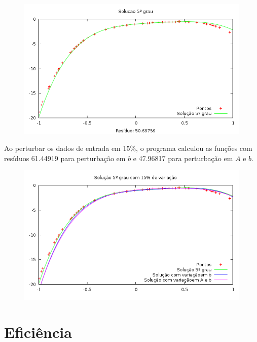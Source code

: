 \begin{figure}[h]
\centering
\includegraphics[scale=0.7]{sol5grau}
\end{figure}
Ao perturbar os dados de entrada em 15\%, o programa calculou as funções 
com resíduos 61.44919  para perturbação em $b$ e 47.96817 para perturbação em $A$ e $b$.
\begin{figure}[h]
\centering
\includegraphics[scale=0.7]{sol5grau_var}
\end{figure}

\chapter{Eficiência}

